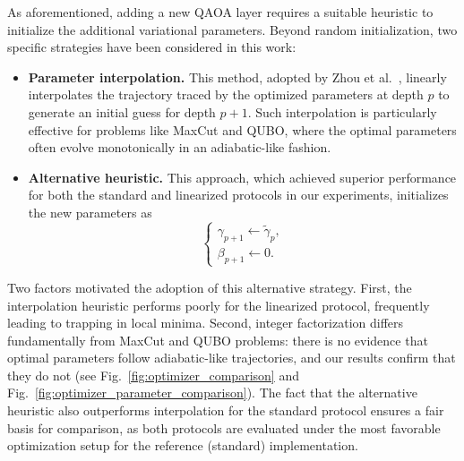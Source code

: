 
As aforementioned, adding a new QAOA layer requires a suitable heuristic to initialize the additional variational parameters. Beyond random initialization, two specific strategies have been considered in this work:

\begin{itemize}
    \item \textbf{Parameter interpolation.}  
    This method, adopted by Zhou et al.~\cite{zhou_quantum_2020}, linearly interpolates the trajectory traced by the optimized parameters at depth $p$ to generate an initial guess for depth $p+1$. Such interpolation is particularly effective for problems like MaxCut and QUBO, where the optimal parameters often evolve monotonically in an adiabatic-like fashion.

    \item \textbf{Alternative heuristic.}  
    This approach, which achieved superior performance for both the standard and linearized protocols in our experiments, initializes the new parameters as
    \begin{equation}
        \begin{cases}
            \gamma_{p+1} \leftarrow \widetilde{\gamma}_{p}, \\
            \beta_{p+1} \leftarrow 0.
        \end{cases}
        \label{eq:initialization_heuristic}
    \end{equation}
\end{itemize}

Two factors motivated the adoption of this alternative strategy.  
First, the interpolation heuristic performs poorly for the linearized protocol, frequently leading to trapping in local minima.  
Second, integer factorization differs fundamentally from MaxCut and QUBO problems: there is no evidence that optimal parameters follow adiabatic-like trajectories, and our results confirm that they do not (see Fig.~\ref{fig:optimizer_comparison} and Fig.~\ref{fig:optimizer_parameter_comparison}).  
The fact that the alternative heuristic also outperforms interpolation for the standard protocol ensures a fair basis for comparison, as both protocols are evaluated under the most favorable optimization setup for the reference (standard) implementation.
